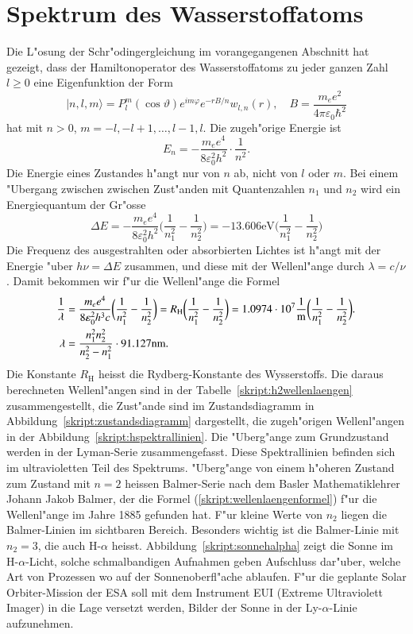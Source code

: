 \section{Spektrum des Wasserstoffatoms}
Die L"osung der Schr"odingergleichung im vorangegangenen Abschnitt
hat gezeigt, dass der Hamiltonoperator des Wasserstoffatoms zu jeder ganzen
Zahl $l\ge 0$ eine Eigenfunktion der Form
\[
|n,l,m\rangle
=
P_l^m(\cos\vartheta) e^{im\varphi}e^{-rB/n}w_{l,n}(r)
,\quad
B=\frac{m_ee^2}{4\pi\varepsilon_0\hbar^2}
\]
hat mit $n>0$, $m=-l,-l+1,\dots,l-1,l$.
Die zugeh"orige Energie ist
\[
E_n=-\frac{m_ee^4}{8\varepsilon_0^2h^2}\cdot \frac1{n^2}.
\]
Die Energie eines Zustandes h"angt nur von $n$ ab, nicht von $l$ oder $m$.
Bei einem "Ubergang zwischen zwischen Zust"anden mit Quantenzahlen $n_1$ und
$n_2$ wird ein Energiequantum der Gr"osse
\begin{equation}
\Delta E
=
-\frac{m_ee^4}{8\varepsilon_0^2h^2}
\biggl(
\frac{1}{n_1^2}
-
\frac{1}{n_2^2}
\biggr)
=
-13.606\text{eV}
\biggl(
\frac{1}{n_1^2}
-
\frac{1}{n_2^2}
\biggr)
\end{equation}
Die Frequenz des ausgestrahlten oder absorbierten Lichtes ist h"angt
mit der Energie "uber $h\nu=\Delta E$ zusammen, und diese mit der
Wellenl"ange durch $\lambda = c/\nu$.
Damit bekommen wir f"ur die Wellenl"ange die Formel
\begin{align}
\frac{1}{\lambda}
&=
\frac{m_ee^4}{8\varepsilon_0^2h^3c}
\biggl(
\frac{1}{n_1^2}
-
\frac{1}{n_2^2}
\biggr)
=
R_{\text{H}}
\biggl(
\frac{1}{n_1^2}
-
\frac{1}{n_2^2}
\biggr)
=
1.0974\cdot 10^7\frac1{\text{m}}
\biggl(
\frac{1}{n_1^2}
-
\frac{1}{n_2^2}
\biggr).
\notag
\\
\lambda
&=
\frac{n_1^2n_2^2}{n_2^2-n_1^2}
\cdot
91.127\text{nm}.
\label{skript:wellenlaengenformel}
\end{align}
Die Konstante $R_{\text{H}}$ heisst die Rydberg-Konstante des
Wysserstoffs.
Die daraus berechneten Wellenl"angen sind in der
Tabelle~\ref{skript:h2wellenlaengen} zusammengestellt, die
Zust"ande sind im Zustandsdiagramm in Abbildung~\ref{skript:zustandsdiagramm}
dargestellt, die zugeh"origen Wellenl"angen in der
Abbildung~\ref{skript:hspektrallinien}.
Die "Uberg"ange zum Grundzustand werden in der Lyman-Serie zusammengefasst.
Diese Spektrallinien befinden sich im ultravioletten Teil des Spektrums.
"Uberg"ange von einem h"oheren Zustand zum Zustand mit $n=2$ 
heissen Balmer-Serie nach dem Basler Mathematiklehrer Johann Jakob Balmer,
der die Formel (\ref{skript:wellenlaengenformel}) f"ur die Wellenl"ange 
im Jahre 1885 gefunden hat.
F"ur kleine Werte von $n_2$ liegen die Balmer-Linien im sichtbaren Bereich.
Besonders wichtig ist die Balmer-Linie mit $n_2=3$, die auch H-$\alpha$
heisst.
Abbildung~\ref{skript:sonnehalpha} zeigt die Sonne im H-$\alpha$-Licht,
solche schmalbandigen Aufnahmen geben Aufschluss dar"uber, welche Art von
Prozessen wo auf der Sonnenoberfl"ache ablaufen.
F"ur die geplante Solar Orbiter-Mission der ESA soll mit dem Instrument
EUI (Extreme Ultraviolett Imager) in die Lage versetzt werden, Bilder
der Sonne in der Ly-$\alpha$-Linie aufzunehmen.

